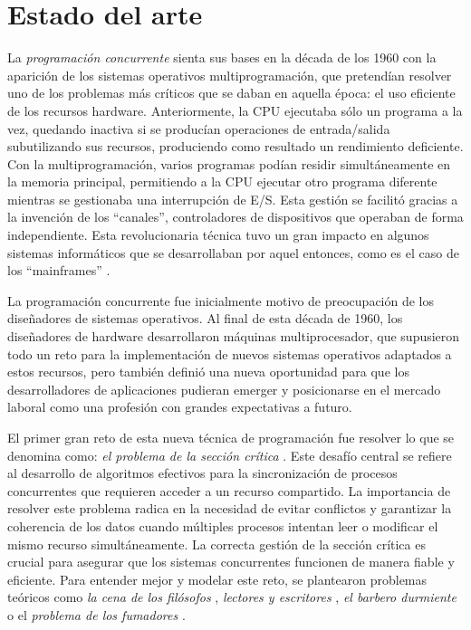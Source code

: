 \chapter{\textbf{Estado del arte}}
La \textit{programación concurrente} sienta sus bases en la década de los 1960 con la aparición de los sistemas operativos multiprogramación, que pretendían resolver uno de los problemas más críticos que se daban en aquella época: el uso eficiente de los recursos hardware. Anteriormente, la CPU ejecutaba sólo un programa a la vez, quedando inactiva si se producían operaciones de entrada/salida subutilizando sus recursos, produciendo como resultado un rendimiento deficiente. Con la multiprogramación, varios programas podían residir simultáneamente en la memoria principal, permitiendo a la CPU ejecutar otro programa diferente mientras se gestionaba una interrupción de E/S. Esta gestión se facilitó gracias a la invención de los ``canales'', controladores de dispositivos que operaban de forma independiente. Esta revolucionaria técnica tuvo un gran impacto en algunos sistemas informáticos que se desarrollaban por aquel entonces, como es el caso de los ``mainframes'' \cite{TecnologiaInformaticaMainframe}.


La programación concurrente fue inicialmente motivo de preocupación de los diseñadores de sistemas operativos. Al final de esta década de 1960, los diseñadores de hardware desarrollaron máquinas multiprocesador, que supusieron todo un reto para la implementación de nuevos sistemas operativos adaptados a estos recursos, pero también definió una nueva oportunidad para que los desarrolladores de aplicaciones pudieran emerger y posicionarse en el mercado laboral como una profesión con grandes expectativas a futuro.



El primer gran reto de esta nueva técnica de programación fue resolver lo que se denomina como: \textit{el problema de la sección crítica} \cite{GeeksForGeeksCriticalSection}. Este desafío central se refiere al desarrollo de algoritmos efectivos para la sincronización de procesos concurrentes que requieren acceder a un recurso compartido. La importancia de resolver este problema radica en la necesidad de evitar conflictos y garantizar la coherencia de los datos cuando múltiples procesos intentan leer o modificar el mismo recurso simultáneamente. La correcta gestión de la sección crítica es crucial para asegurar que los sistemas concurrentes funcionen de manera fiable y eficiente. Para entender mejor y modelar este reto, se plantearon problemas teóricos como \textit{la cena de los filósofos} \cite{brosgol1996dining}, \textit{lectores y escritores} \cite{nithyasrikannathalreaders}, \textit{el barbero durmiente} \cite{SariSleepingBarber} o el \textit{problema de los fumadores} \cite{MTUSmokerProblem}.


